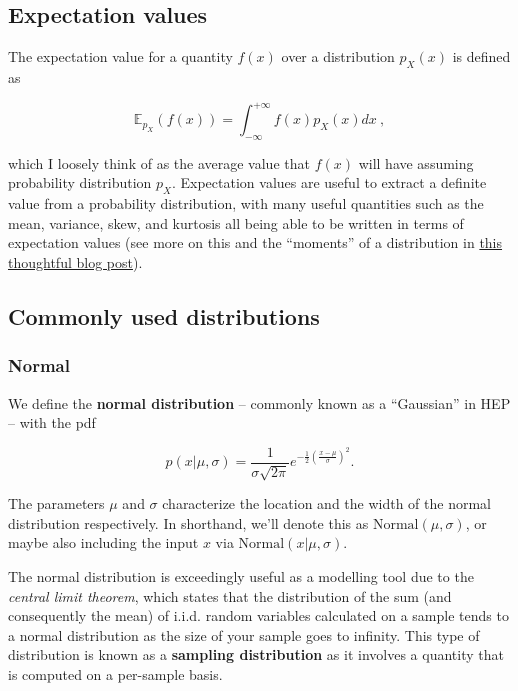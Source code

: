 \documentclass[
  11pt,
  numbers=noendperiod]{book}
\begin{document}
\hypertarget{expectation-values}{%
\subsection{Expectation values}\label{expectation-values}}

The expectation value for a quantity \(f(x)\) over a distribution
\(p_X(x)\) is defined as

\[
\mathbb{E}_{p_X}(f(x)) = \int_{-\infty}^{+\infty} f(x) p_X(x) dx~,
\]

which I loosely think of as the average value that \(f(x)\) will have
assuming probability distribution \(p_X\). Expectation values are useful
to extract a definite value from a probability distribution, with many
useful quantities such as the mean, variance, skew, and kurtosis all
being able to be written in terms of expectation values (see more on
this and the ``moments'' of a distribution in
\href{https://gregorygundersen.com/blog/2020/04/11/moments/}{this
thoughtful blog post}).

\hypertarget{sec-dists}{%
\subsection{Commonly used distributions}\label{sec-dists}}

\hypertarget{normal}{%
\subsubsection*{Normal}\label{normal}}

We define the \textbf{normal distribution} -- commonly known as a
``Gaussian'' in HEP -- with the pdf

\[ p(x | \mu, \sigma) = \frac{1}{\sigma \sqrt{2\pi} } e^{-\frac{1}{2}\left(\frac{x-\mu}{\sigma}\right)^2} .\]

The parameters \(\mu\) and \(\sigma\) characterize the location and the
width of the normal distribution respectively. In shorthand, we'll
denote this as \(\mathrm{Normal}(\mu, \sigma)\), or maybe also including
the input \(x\) via \(\mathrm{Normal}(x|\mu, \sigma)\).

The normal distribution is exceedingly useful as a modelling tool due to
the \emph{central limit theorem}, which states that the distribution of
the sum (and consequently the mean) of i.i.d. random variables
calculated on a sample tends to a normal distribution as the size of
your sample goes to infinity. This type of distribution is known as a
\textbf{sampling distribution} as it involves a quantity that is
computed on a per-sample basis.
\end{document}
